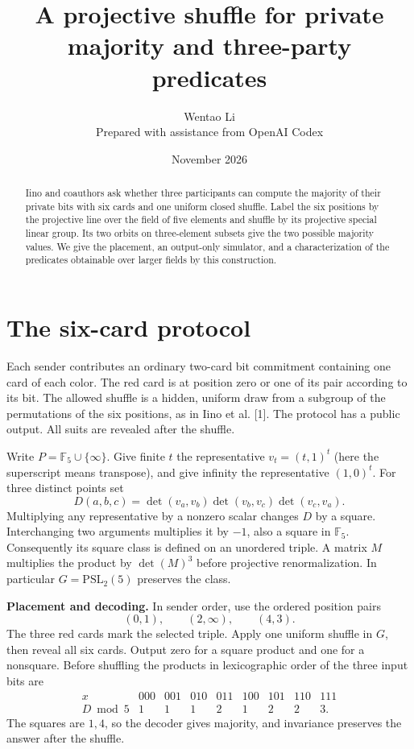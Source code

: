 \documentclass[11pt]{article}
\title{A projective shuffle for private majority and three-party predicates}
\author{Wentao Li\\[2pt]\small Prepared with assistance from OpenAI Codex}
\date{November 2026}
\begin{document}
\maketitle
\begin{abstract}
Iino and coauthors ask whether three participants can compute the majority of their private bits with six cards and one uniform closed shuffle. Label the six positions by the projective line over the field of five elements and shuffle by its projective special linear group. Its two orbits on three-element subsets give the two possible majority values. We give the placement, an output-only simulator, and a characterization of the predicates obtainable over larger fields by this construction.
\end{abstract}
\section{The six-card protocol}
Each sender contributes an ordinary two-card bit commitment containing one card of each color. The red card is at position zero or one of its pair according to its bit. The allowed shuffle is a hidden, uniform draw from a subgroup of the permutations of the six positions, as in Iino et al. [1]. The protocol has a public output. All suits are revealed after the shuffle.

Write $P=\mathbb F_5\cup\{\infty\}$. Give finite $t$ the representative $v_t=(t,1)^t$ (here the superscript means transpose), and give infinity the representative $(1,0)^t$. For three distinct points set
\[
 D(a,b,c)=\det(v_a,v_b)\det(v_b,v_c)\det(v_c,v_a).
\]
Multiplying any representative by a nonzero scalar changes $D$ by a square. Interchanging two arguments multiplies it by $-1$, also a square in $\mathbb F_5$. Consequently its square class is defined on an unordered triple. A matrix $M$ multiplies the product by $\det(M)^3$ before projective renormalization. In particular $G=\mathrm{PSL}_2(5)$ preserves the class.

\textbf{Placement and decoding.}
In sender order, use the ordered position pairs
\[
 (0,1),\qquad(2,\infty),\qquad(4,3).
\]
The three red cards mark the selected triple. Apply one uniform shuffle in $G$, then reveal all six cards. Output zero for a square product and one for a nonsquare. Before shuffling the products in lexicographic order of the three input bits are
\[
\begin{array}{c|rrrrrrrr}
 x&000&001&010&011&100&101&110&111\\\hline
 D\bmod 5&1&1&1&2&1&2&2&3 .
\end{array}
\]
The squares are $1,4$, so the decoder gives majority, and invariance preserves the answer after the shuffle.
\end{document}
